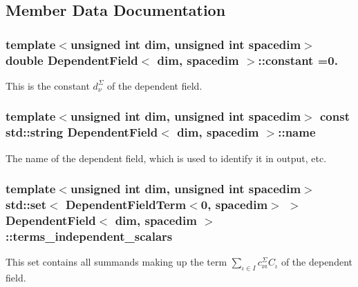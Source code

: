 \subsection{Member Data Documentation}
\subsubsection[{\texorpdfstring{constant}{constant}}]{\setlength{\rightskip}{0pt plus 5cm}template$<$unsigned int dim, unsigned int spacedim$>$ double {\bf Dependent\+Field}$<$ dim, spacedim $>$\+::constant =0.\hspace{0.3cm}{\ttfamily [private]}}\hypertarget{class_dependent_field_a32b37c78e04a16b6b606442f156c8ca9}{}\label{class_dependent_field_a32b37c78e04a16b6b606442f156c8ca9}
This is the constant $d^\Sigma_\nu$ of the dependent field. 
\subsubsection[{\texorpdfstring{name}{name}}]{\setlength{\rightskip}{0pt plus 5cm}template$<$unsigned int dim, unsigned int spacedim$>$ const std\+::string {\bf Dependent\+Field}$<$ dim, spacedim $>$\+::name}\hypertarget{class_dependent_field_a698b255f131279d1edb97b3c525153a0}{}\label{class_dependent_field_a698b255f131279d1edb97b3c525153a0}
The name of the dependent field, which is used to identify it in output, etc. 
\subsubsection[{\texorpdfstring{terms\+\_\+independent\+\_\+scalars}{terms_independent_scalars}}]{\setlength{\rightskip}{0pt plus 5cm}template$<$unsigned int dim, unsigned int spacedim$>$ std\+::set$<$ {\bf Dependent\+Field\+Term}$<$0, spacedim$>$ $>$ {\bf Dependent\+Field}$<$ dim, spacedim $>$\+::terms\+\_\+independent\+\_\+scalars\hspace{0.3cm}{\ttfamily [private]}}\hypertarget{class_dependent_field_aa1ba265eae76489d22d3eecd595931c5}{}\label{class_dependent_field_aa1ba265eae76489d22d3eecd595931c5}
This set contains all summands making up the term $\sum_{\iota \in I}c^\Sigma_{\nu\iota} C_\iota$ of the dependent field. 
